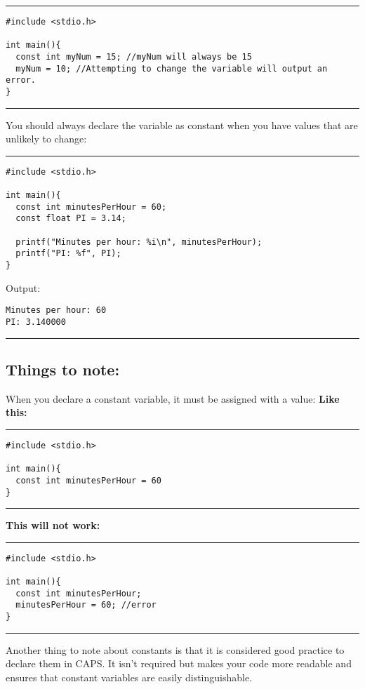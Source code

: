 \documentclass[a4paper]{article}
\begin{document}
\noindent\rule{\textwidth}{0.5pt}
\begin{verbatim}
#include <stdio.h>

int main(){
  const int myNum = 15; //myNum will always be 15
  myNum = 10; //Attempting to change the variable will output an error.
}
\end{verbatim}

\noindent\rule{\textwidth}{0.5pt}

You should always declare the variable as constant when you have values that are
unlikely to change:

\noindent\rule{\textwidth}{0.5pt}
\begin{verbatim}
#include <stdio.h>

int main(){
  const int minutesPerHour = 60;
  const float PI = 3.14;

  printf("Minutes per hour: %i\n", minutesPerHour);
  printf("PI: %f", PI);
}
\end{verbatim}
Output:
\begin{verbatim}
Minutes per hour: 60
PI: 3.140000
\end{verbatim}

\noindent\rule{\textwidth}{0.5pt}

\subsection{Things to note:}
\label{sec:org29d56b1}
When you declare a constant variable, it must be assigned with a value:
\textbf{Like this:}

\noindent\rule{\textwidth}{0.5pt}
\begin{verbatim}
#include <stdio.h>

int main(){
  const int minutesPerHour = 60
}
\end{verbatim}

\noindent\rule{\textwidth}{0.5pt}
\textbf{This will not work:}

\noindent\rule{\textwidth}{0.5pt}
\begin{verbatim}
#include <stdio.h>

int main(){
  const int minutesPerHour;
  minutesPerHour = 60; //error
}
\end{verbatim}

\noindent\rule{\textwidth}{0.5pt}
Another thing to note about constants is that it is considered good practice to
declare them in CAPS. It isn't required but makes your code more readable and
ensures that constant variables are easily distinguishable.
\end{document}

